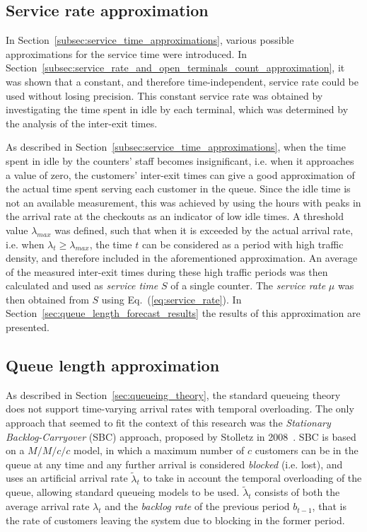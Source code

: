 \subsection{Service rate approximation}
\label{subsec:service_rate_approximation}

In Section~\ref{subsec:service_time_approximations}, various possible approximations for the service time were introduced. In Section~\ref{subsec:service_rate_and_open_terminals_count_approximation}, it was shown that a constant, and therefore time-independent, service rate could be used without losing precision. This constant service rate was obtained by investigating the time spent in idle by each terminal, which was determined by the analysis of the inter-exit times.

As described in Section~\ref{subsec:service_time_approximations}, when the time spent in idle by the counters’ staff becomes insignificant, i.e. when it approaches a value of zero, the customers’ inter-exit times can give a good approximation of the actual time spent serving each customer in the queue. Since the idle time is not an available measurement, this was achieved by using the hours with peaks in the arrival rate at the checkouts as an indicator of low idle times. A threshold value \( \lambda_{max} \) was defined, such that when it is exceeded by the actual arrival rate, i.e. when \( \lambda_t \ge \lambda_{max} \), the time \( t \) can be considered as a period with high traffic density, and therefore included in the aforementioned approximation. An average of the measured inter-exit times during these high traffic periods was then calculated and used as \emph{service time} \( S \) of a single counter. The \emph{service rate} \( \mu \) was then obtained from \( S \) using Eq.~(\ref{eq:service_rate}). In Section~\ref{sec:queue_length_forecast_results} the results of this approximation are presented.

\subsection{Queue length approximation}
\label{subsec:queue_length_approximation}

As described in Section~\ref{sec:queueing_theory}, the standard queueing theory does not support time-varying arrival rates with temporal overloading. The only approach that seemed to fit the context of this research was the \emph{Stationary Backlog-Carryover} (SBC) approach, proposed by Stolletz in 2008~\cite{stolletz}. SBC is based on a \( M/M/c/c \) model, in which a maximum number of \( c \) customers can be in the queue at any time and any further arrival is considered \emph{blocked} (i.e. lost), and uses an artificial arrival rate \( \widetilde{\lambda}_t \) to take in account the temporal overloading of the queue, allowing standard queueing models to be used. \( \widetilde{\lambda}_t \) consists of both the average arrival rate \( \lambda_t \) and the \emph{backlog rate} of the previous period \( b_{t-1} \), that is the rate of customers leaving the system due to blocking in the former period.

